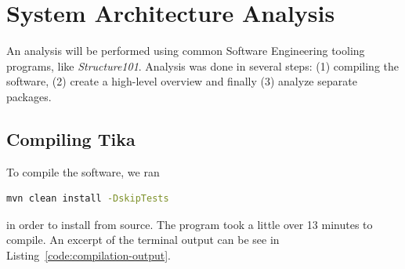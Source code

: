 \documentclass{article}
\begin{document}
\begin{itemize}

\end{itemize}
\section{System Architecture Analysis}
An analysis will be performed using common Software Engineering tooling programs, like \textit{Structure101}. Analysis was done in several steps: (1) compiling the software, (2) create a high-level overview and finally (3) analyze separate packages.

\subsection{Compiling Tika}
To compile the software, we ran 

\begin{lstlisting}[language=bash]
mvn clean install -DskipTests
\end{lstlisting}

in order to install from source. The program took a little over 13 minutes to compile. An excerpt of the terminal output can be see in Listing~\ref{code:compilation-output}.

\end{document}
